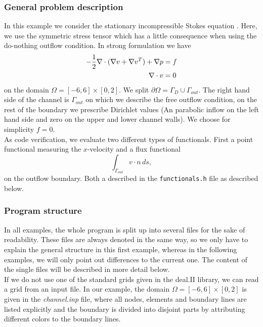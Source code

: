\subsubsection{General problem description}
In this example we consider the stationary incompressible Stokes equation . Here,
we use the symmetric stress tensor which has a little consequence when using 
the do-nothing outflow condition. In strong formulation we have
\begin{align} \label{eq:strong}
-\frac{1}{2}\nabla\cdot (\nabla v + \nabla v^{T}) + \nabla p &= f \\ 
\nabla \cdot v &= 0 \notag
\end{align} 
on the domain $\Omega = [-6,6]\times [0,2]$. We split $\partial \Omega = \Gamma_D \cup \Gamma_{out}$. The right hand side of the channel is $\Gamma_{out}$ on which we describe the free outflow condition, on the rest of the boundary we prescribe Dirichlet values (An parabolic inflow on the left hand side and zero on the upper and lower channel walls). We choose for simplicity $f=0$.\\

As code verification, we evaluate two different types of functionals. 
First a point functional measuring the $x$-velocity and 
a flux functional 
\[
\int_{\Gamma_{out}} v\cdot n \, ds,
\]
on the outflow boundary. Both a described in the 
\texttt{functionals.h} file as described below.

\subsubsection{Program structure}

In all examples, the whole program is split up into several files for the sake of readability. These files are always denoted in the same way, so we only have to explain the general structure in this first example, whereas in the following examples, we will only point out differences to the current one. The content of the single files will be described in more detail below.\\

If we do not use one of the standard grids given in the deal.II library, we can read a grid from an input file. In our example, the domain $\Omega = [-6,6]\times [0,2]$ is given in the \textit{channel.inp} file, where all nodes, elements and boundary lines are listed explicitly and the boundary is divided into disjoint parts by attributing different colors to the boundary lines.\\

